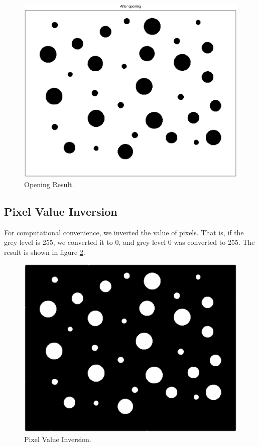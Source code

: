 \documentclass[paper=a4, fontsize=11pt]{scrartcl}
\begin{document}
\begin{figure}
	\centering
	\includegraphics[width=12cm]{opening.eps}
	\caption{Opening Result.}
	\label{fig:4}
\end{figure}





\subsection{Pixel Value Inversion}

For computational convenience, we inverted the value of pixels.  That is, if the grey level is 255, we converted it to 0, and grey level 0 was converted to 255. The result is shown in figure \ref{fig:5}. 
 

\begin{figure}
	\centering
	\includegraphics[width=12cm]{complement.eps}
	\caption{Pixel Value Inversion.}
	\label{fig:5}
\end{figure}
\end{document}
